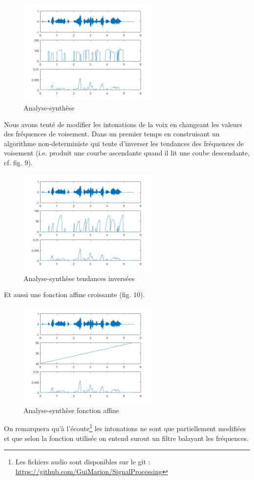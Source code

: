 \documentclass{article}
\begin{document}
\begin{figure}[!h]
    \center
    \includegraphics[width=7cm]{SynthNormal.png}
    \caption{Analyse-synthèse}
\end{figure}

Nous avons tenté de modifier les intonations de la voix en changeant les valeurs des fréquences de voisement. Dans un premier temps en construisant un algorithme non-deterministe qui tente d'inverser les tendances des fréquences de voisement (i.e. produit une courbe ascendante quand il lit une coube descendante, cf. fig. 9). 

\begin{figure}[!h]
    \center
    \includegraphics[width=7cm]{SynthInverse.png}
    \caption{Analyse-synthèse tendances inversées}
\end{figure}

Et aussi une fonction affine croissante (fig. 10).

\begin{figure}[!h]
    \center
    \includegraphics[width=7cm]{SynthLinear.png}
    \caption{Analyse-synthèse fonction affine}
\end{figure}

On remarquera qu'à l'écoute\footnote{Les fichiers audio sont disponibles sur le git : \url{https://github.com/GuiMarion/SignalProcessing}} les intonations ne sont que partiellement modifiées et que selon la fonction utilisée on entend surout un filtre balayant les fréquences. 
\end{document}
